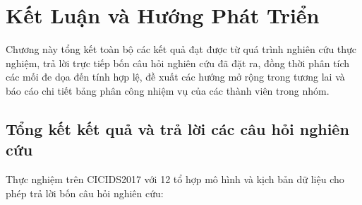 
\chapter{Kết Luận và Hướng Phát Triển}
\label{chap:ket_luan}

Chương này tổng kết toàn bộ các kết quả đạt được từ quá trình nghiên cứu thực nghiệm, trả lời trực tiếp bốn câu hỏi nghiên cứu đã đặt ra, đồng thời phân tích các mối đe dọa đến tính hợp lệ, đề xuất các hướng mở rộng trong tương lai và báo cáo chi tiết bảng phân công nhiệm vụ của các thành viên trong nhóm.

\section{Tổng kết kết quả và trả lời các câu hỏi nghiên cứu}
\label{sec:rq_answers}

Thực nghiệm trên CICIDS2017 với 12 tổ hợp mô hình và kịch bản dữ liệu cho phép trả lời bốn câu hỏi nghiên cứu:

